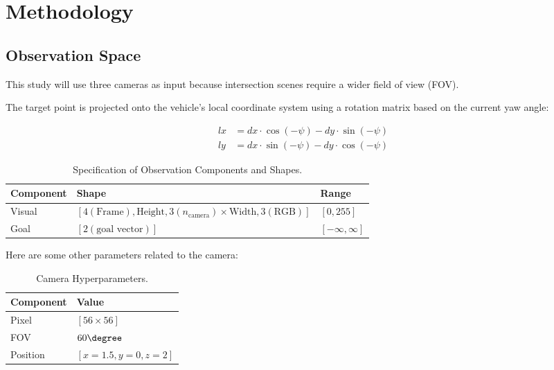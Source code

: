 
\section{Methodology}
    \subsection{Observation Space}
    This study will use three cameras as input because intersection scenes require a wider field of view (FOV). 

    The target point is projected onto the vehicle's local coordinate system using a rotation matrix based on the current yaw angle:

    \begin{align*}
    lx &= dx \cdot \cos(-\psi) - dy \cdot \sin(-\psi) \\
    ly &= dx \cdot \sin(-\psi) - dy \cdot \cos(-\psi)
    \end{align*}

    \begin{table}[htbp]
    \centering
    \caption{Specification of Observation Components and Shapes.}
    \label{tab:observation_shapes}
    \begin{tabular}{lll}
    \toprule
    \textbf{Component} & \textbf{Shape} & \textbf{Range} \\
    \midrule
    Visual & $[4(\text{Frame}), \text{Height}, 3(n_{\text{camera}}) \times \text{Width}, 3(\text{RGB})]$ & $[0, 255]$ \\
    \addlinespace
    Goal   & $[2(\text{goal vector})]$ & $[-\infty, \infty]$ \\
    \bottomrule
    \end{tabular}
    \end{table}

    Here are some other parameters related to the camera:

    \begin{table}[htbp]
    \centering
    \caption{Camera Hyperparameters.}
    \label{tab:cam parameters}
    \begin{tabular}{ll}
    \toprule
    \textbf{Component} & \textbf{Value} \\
    \midrule
    Pixel & $[56\times56]$ \\
    \addlinespace
    FOV   & $60\degree$ \\
    \addlinespace
    Position & $[x=1.5,y=0,z=2]$ \\
    \bottomrule
    \end{tabular}
    \end{table}
    
